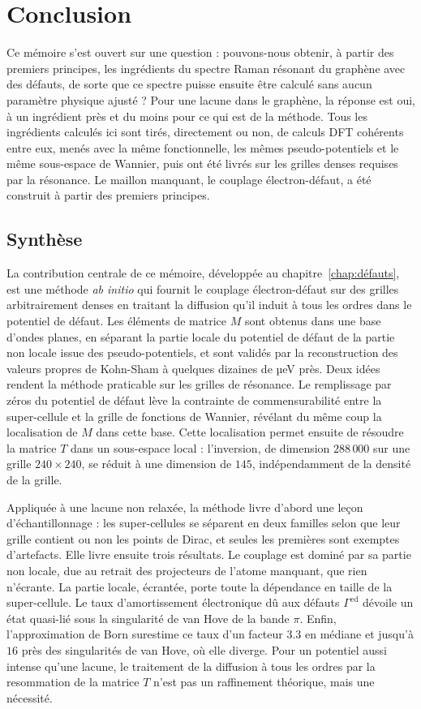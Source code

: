 \chapter{Conclusion}\label{chap:conclusion}

Ce mémoire s'est ouvert sur une question : pouvons-nous obtenir, à partir des premiers principes, les ingrédients du spectre Raman résonant du graphène avec des défauts, de sorte que ce spectre puisse ensuite être calculé sans aucun paramètre physique ajusté ? Pour une lacune dans le graphène, la réponse est oui, à un ingrédient
près et du moins pour ce qui est de la méthode. Tous les ingrédients calculés ici sont tirés, directement ou non, de calculs DFT cohérents entre eux, menés avec la même fonctionnelle, les mêmes pseudo-potentiels et le même sous-espace de Wannier, puis ont été livrés sur les grilles denses requises par la résonance. Le maillon manquant, le couplage électron-défaut, a été construit à partir des premiers principes.

\section{Synthèse}

La contribution centrale de ce mémoire, développée au chapitre~\ref{chap:défauts}, est une méthode \textit{ab initio} qui fournit le couplage électron-défaut sur des grilles arbitrairement denses en traitant la diffusion qu'il induit à tous les ordres dans le potentiel de défaut. Les éléments de matrice $M$ sont obtenus dans une base d'ondes planes, en séparant la partie locale du potentiel de défaut de la partie non locale issue des pseudo-potentiels, et sont validés par la reconstruction des valeurs propres de Kohn-Sham à quelques dizaines de µeV près. Deux idées rendent la méthode praticable sur les grilles de résonance. Le remplissage par zéros du potentiel de défaut lève la contrainte de commensurabilité entre la super-cellule et la grille de fonctions de Wannier, révélant du même coup la localisation de $M$ dans cette base. Cette localisation permet ensuite de résoudre la matrice $T$ dans un sous-espace local : l'inversion, de dimension $288\,000$ sur une grille $240\times 240$, se réduit à une dimension de $145$, indépendamment de la densité de la grille.

Appliquée à une lacune non relaxée, la méthode livre d'abord une leçon d'échantillonnage : les super-cellules se séparent en deux familles selon que leur grille contient ou non les points de Dirac, et seules les premières sont exemptes d'artefacts. Elle livre ensuite trois résultats. Le couplage est dominé par sa partie non locale, due au retrait des projecteurs de l'atome manquant, que rien n'écrante. La partie locale, écrantée, porte toute la dépendance en taille de la super-cellule. Le taux d'amortissement électronique dû aux défauts $\Gamma^\text{ed}$ dévoile un état quasi-lié sous la singularité de van Hove de la bande $\pi$. Enfin, l'approximation de Born surestime ce taux d'un facteur $3.3$ en médiane et jusqu'à $16$ près des singularités de van Hove, où elle diverge. Pour un potentiel aussi intense qu'une lacune, le traitement de la diffusion à tous les ordres par la resommation de la matrice $T$ n'est pas un raffinement théorique, mais une nécessité.

